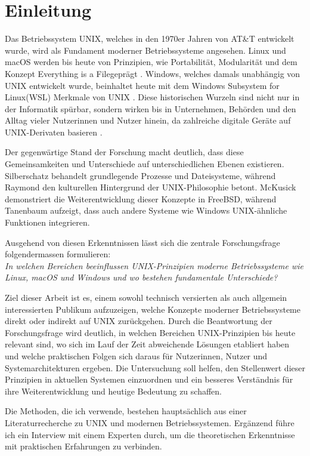 \section{Einleitung}
Das Betriebssystem UNIX, welches in den 1970er Jahren von AT\&T entwickelt wurde, wird als Fundament moderner Betriebssysteme angesehen. Linux und macOS werden bis heute von Prinzipien, wie Portabilität, Modularität und dem Konzept \glqq Everything is a File\grqq geprägt \cite{ArtOfUnixProgramming, ModernOS}. Windows, welches damals unabhängig von UNIX entwickelt wurde, beinhaltet heute mit dem \glqq Windows Subsystem for Linux\grqq (WSL) Merkmale von UNIX \cite{WSL}. Diese historischen Wurzeln sind nicht nur in der Informatik spürbar, sondern wirken bis in Unternehmen, Behörden und den Alltag vieler Nutzerinnen und Nutzer hinein, da zahlreiche digitale Geräte auf UNIX-Derivaten basieren \cite{FreeBSDOS, OSConcept}.

Der gegenwärtige Stand der Forschung macht deutlich, dass diese Gemeinsamkeiten und Unterschiede auf unterschiedlichen Ebenen existieren.  Silberschatz \cite{OSConcept} behandelt grundlegende Prozesse und Dateisysteme, während Raymond \cite{ArtOfUnixProgramming} den kulturellen Hintergrund der UNIX-Philosophie betont.  McKusick \cite{FreeBSDOS} demonstriert die Weiterentwicklung dieser Konzepte in FreeBSD, während Tanenbaum \cite{ModernOS} aufzeigt, dass auch andere Systeme wie Windows UNIX-ähnliche Funktionen integrieren.

Ausgehend von diesen Erkenntnissen lässt sich die zentrale Forschungsfrage folgendermassen formulieren:\\
\textit{In welchen Bereichen beeinflussen UNIX-Prinzipien moderne Betriebssysteme wie Linux, macOS und Windows und wo bestehen fundamentale Unterschiede?}

Ziel dieser Arbeit ist es, einem sowohl technisch versierten als auch allgemein interessierten Publikum aufzuzeigen, welche Konzepte moderner Betriebssysteme direkt oder indirekt auf UNIX zurückgehen. Durch die Beantwortung der Forschungsfrage wird deutlich, in welchen Bereichen UNIX-Prinzipien bis heute relevant sind, wo sich im Lauf der Zeit abweichende Lösungen etabliert haben und welche praktischen Folgen sich daraus für Nutzerinnen, Nutzer und Systemarchitekturen ergeben. Die Untersuchung soll helfen, den Stellenwert dieser Prinzipien in aktuellen Systemen einzuordnen und ein besseres Verständnis für ihre Weiterentwicklung und heutige Bedeutung zu schaffen.

Die Methoden, die ich verwende, bestehen hauptsächlich aus einer Literaturrecherche zu UNIX und modernen Betriebssystemen. Ergänzend führe ich ein Interview mit einem Experten durch, um die theoretischen Erkenntnisse mit praktischen Erfahrungen zu verbinden.